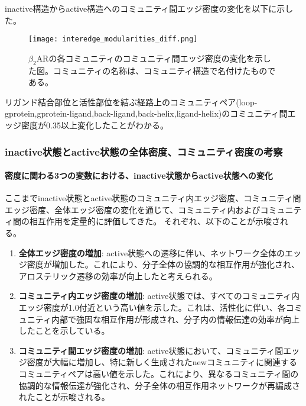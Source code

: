 inactive構造からactive構造へのコミュニティ間エッジ密度の変化を以下に示した。

\begin{figure}[htbp]
  \centering
  \texttt{[image: interedge\_modularities\_diff.png]}
  \caption{$\beta_2$ARの各コミュニティのコミュニティ間エッジ密度の変化を示した図。コミュニティの名称は、コミュニティ構造で名付けたものである。}
  \label{fig:inter_diff}
\end{figure}

\newpage

リガンド結合部位と活性部位を結ぶ経路上のコミュニティペア(loop-gprotein,gprotein-ligand,back-ligand,back-helix,ligand-helix)のコミュニティ間エッジ密度が0.35以上変化したことがわかる。

\subsubsection{inactive状態とactive状態の全体密度、コミュニティ密度の考察}


\paragraph{密度に関わる3つの変数における、inactive状態からactive状態への変化}

ここまでinactive状態とactive状態のコミュニティ内エッジ密度、コミュニティ間エッジ密度、全体エッジ密度の変化を通じて、コミュニティ内およびコミュニティ間の相互作用を定量的に評価してきた。
それぞれ、以下のことが示唆される。
\begin{enumerate}
  \item \textbf{全体エッジ密度の増加}: active状態への遷移に伴い、ネットワーク全体のエッジ密度が増加した。これにより、分子全体の協調的な相互作用が強化され、アロステリック遷移の効率が向上したと考えられる。
  \item \textbf{コミュニティ内エッジ密度の増加}: active状態では、すべてのコミュニティ内エッジ密度が1.0付近という高い値を示した。これは、活性化に伴い、各コミュニティ内部で強固な相互作用が形成され、分子内の情報伝達の効率が向上したことを示している。
  \item \textbf{コミュニティ間エッジ密度の増加}: active状態において、コミュニティ間エッジ密度が大幅に増加し、特に新しく生成されたnewコミュニティに関連するコミュニティペアは高い値を示した。これにより、異なるコミュニティ間の協調的な情報伝達が強化され、分子全体の相互作用ネットワークが再編成されたことが示唆される。
\end{enumerate}

